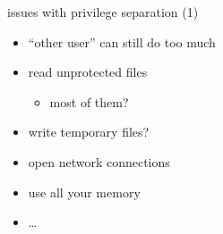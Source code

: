 
\begin{frame}{issues with privilege separation (1)}
    \begin{itemize}
    \item ``other user'' can still do too much
    \vspace{.5cm}
    \item read unprotected files
        \begin{itemize}
        \item most of them?
        \end{itemize}
    \item write temporary files?
    \item open network connections
    \item use all your memory
    \item \ldots
    \end{itemize}
\end{frame}



